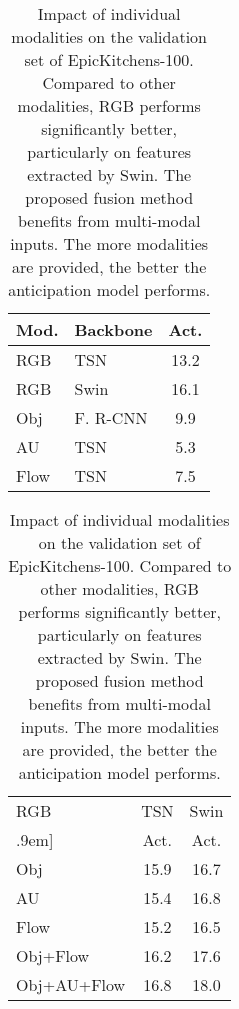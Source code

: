 \documentclass[10pt,twocolumn,letterpaper,dvipsnames]{article}
\begin{document}
\begin{table}[t]
	\centering
	\setlength\tabcolsep{2pt}
	\begin{subtable}[t]{0.4\linewidth}
 \centering
            
			\begin{tabular}[t]{llc}
				\toprule
				Mod. & Backbone & Act.\\
				\midrule
				RGB & TSN & 13.2 \\
				RGB  & Swin & 16.1 \\
				Obj  & F. R-CNN &9.9 \\
				AU  & TSN& 5.3 \\
				Flow  & TSN & 7.5 \\ 
				\bottomrule	
		\end{tabular}
	\vspace{0.7cm}
	\caption{Results of individual modalities.}
	\label{table:sub_single}
	\end{subtable}\hfill
	\begin{subtable}[t]{0.59\linewidth}
 \centering
            
			\begin{tabular}[t]{lcc}
				\toprule
			\multicolumn{1}{l|}{RGB}	& TSN & Swin  \\ 
				\arrayrulecolor{gray}
                    \cmidrule(lr){2-2} 
                    \cmidrule(lr){3-3}
                    \arrayrulecolor{black} 
                    \-.9em]
				 \multicolumn{1}{l|}{Other} & Act. & Act. \\
				\cmidrule{1-3}
				\multicolumn{1}{l|}{Obj} & 15.9 & 16.7  \\
				\multicolumn{1}{l|}{AU} & 15.4 & 16.8  \\
				\multicolumn{1}{l|}{Flow} & 15.2 & 16.5  \\
				\multicolumn{1}{l|}{Obj+Flow} & 16.2 & 17.6 \\
				\multicolumn{1}{l|}{Obj+AU+Flow} & 16.8 & 18.0 \\
				\bottomrule
		\end{tabular}
		\caption{Results of multiple modalities combined with RGB.}
		\label{tab:sub_fusion}
	\end{subtable}
	\caption{Impact of individual modalities on the validation set of EpicKitchens-100. Compared to other modalities, RGB performs significantly better, particularly on features extracted by Swin. The proposed fusion method benefits from multi-modal inputs. The more modalities are provided, the better the anticipation model performs.}
	\label{tab:impact_modality}
\end{table} 
\end{document}
